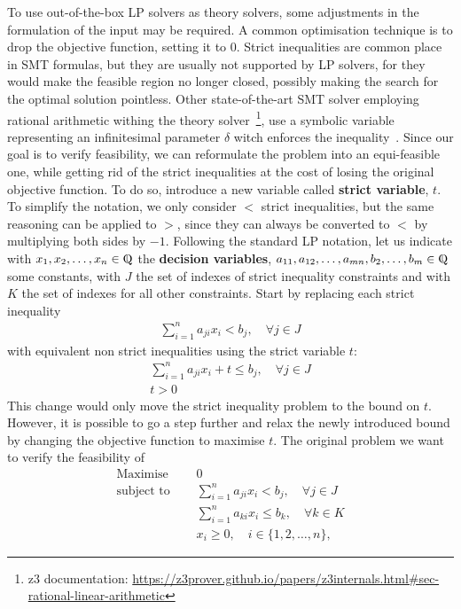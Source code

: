 \documentclass[runningheads]{llncs}
\begin{document}
To use out-of-the-box LP solvers as theory solvers, some adjustments in the formulation of the input may be required.
A common optimisation technique is to drop the objective function, setting it to $0$.
Strict inequalities are common place in SMT formulas, but they are usually not supported by LP solvers, for they would make the feasible region no longer closed, possibly making the search for the optimal solution pointless.
Other state-of-the-art SMT solver employing rational arithmetic withing the theory solver~\footnote{z3 documentation: \url{https://z3prover.github.io/papers/z3internals.html\#sec-rational-linear-arithmetic}}, use a symbolic variable representing an infinitesimal parameter $\delta$ witch enforces the inequality~\cite{ref:lra-dpll-t}.
Since our goal is to verify feasibility, we can reformulate the problem into an equi-feasible one, while getting rid of the strict inequalities at the cost of losing the original objective function.
To do so, introduce a new variable called \textbf{strict variable}, $t$.
To simplify the notation, we only consider $<$ strict inequalities, but the same reasoning can be applied to $>$, since they can always be converted to $<$ by multiplying both sides by $-1$.
Following the standard LP notation, let us indicate with $x_1, x_2, \ldots, x_n \in \bbbq$ the \textbf{decision variables}, $a_{11}, a_{12}, \ldots, a_{mn}, b_{2}, \ldots, b_{m}\in \bbbq$ some constants, with $J$ the set of indexes of strict inequality constraints and with $K$ the set of indexes for all other constraints.
Start by replacing each strict inequality
\begin{align*}
    \sum_{i=1}^{n} a_{ji}x_{i} < b_j, \quad \forall j \in J
\end{align*}
with equivalent non strict inequalities using the strict variable $t$:
\begin{align*}
    \sum_{i=1}^{n} a_{ji}x_{i} + t \le b_j, \quad \forall j \in J \\
    t > 0
\end{align*}
This change would only move the strict inequality problem to the bound on $t$.
However, it is possible to go a step further and relax the newly introduced bound by changing the objective function to maximise $t$.
The original problem we want to verify the feasibility of
\begin{equation}
    \label{eq:lp-original}
    \begin{split}
        \text{Maximise }   \quad & 0                                                          \\
        \text{subject to } \quad & \sum_{i=1}^{n} a_{ji}x_{i} < b_j,   \quad \forall j \in J  \\
        \quad                    & \sum_{i=1}^{n} a_{ki}x_{i} \le b_k,  \quad \forall k \in K \\
                                 & x_i \ge 0,  \quad i \in \{1, 2, \ldots, n\},
    \end{split}
\end{equation}
\end{document}
